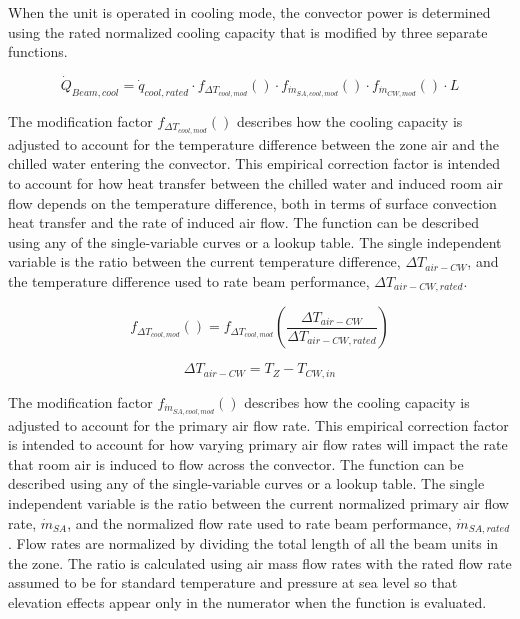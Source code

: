 When the unit is operated in cooling mode, the convector power is determined using the rated normalized cooling capacity that is modified by three separate functions.

\begin{equation}
{\dot Q_{Beam, cool}} = { \dot q_{cool,rated} \cdot f_{ \Delta T_{cool,mod} }() \cdot f_{\dot m_{SA,cool,mod}}() \cdot f_{\dot m_{CW,mod}}() \cdot L }
\end{equation}

The modification factor \({f_{ \Delta T_{cool,mod} }() }\) describes how the cooling capacity is adjusted to account for the temperature difference between the zone air and the chilled water entering the convector. This empirical correction factor is intended to account for how heat transfer between the chilled water and induced room air flow depends on the temperature difference, both in terms of surface convection heat transfer and the rate of induced air flow. The function can be described using any of the single-variable curves or a lookup table. The single independent variable is the ratio between the current temperature difference, \({\Delta T_{air-CW}}\), and the temperature difference used to rate beam performance, \({\Delta T_{air-CW,rated}}\).

\begin{equation}
{f_{ \Delta T_{cool,mod} }() } = f_{ \Delta T_{cool,mod} }\left(\frac{\Delta T_{air-CW}}{\Delta T_{air-CW,rated}}\right)
\end{equation}

\begin{equation}
{\Delta T_{air-CW}} = {T_{Z}}-{T_{CW,in}}
\end{equation}

The modification factor \({f_{\dot m_{SA,cool,mod}}()}\) describes how the cooling capacity is adjusted to account for the primary air flow rate. This empirical correction factor is intended to account for how varying primary air flow rates will impact the rate that room air is induced to flow across the convector. The function can be described using any of the single-variable curves or a lookup table. The single independent variable is the ratio between the current normalized primary air flow rate, \({\dot m_{SA}}\), and the normalized flow rate used to rate beam performance, \({\dot m_{SA,rated}}\). Flow rates are normalized by dividing the total length of all the beam units in the zone. The ratio is calculated using air mass flow rates with the rated flow rate assumed to be for standard temperature and pressure at sea level so that elevation effects appear only in the numerator when the function is evaluated.

